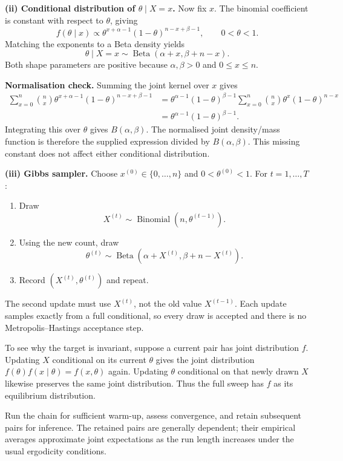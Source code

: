 \documentclass[11pt,a4paper]{article}
\begin{document}
\textbf{(ii) Conditional distribution of $\theta\mid X=x$.}
Now fix $x$. The binomial coefficient is constant with respect to $\theta$,
giving
\[
f(\theta\mid x)\propto
\theta^{x+\alpha-1}(1-\theta)^{n-x+\beta-1},\qquad 0<\theta<1.
\]
Matching the exponents to a Beta density yields
\[
\boxed{\theta\mid X=x\sim
\operatorname{Beta}(\alpha+x,\beta+n-x).}
\]
Both shape parameters are positive because $\alpha,\beta>0$ and
$0\leq x\leq n$.

\textbf{Normalisation check.}
Summing the joint kernel over $x$ gives
\[
\begin{aligned}
\sum_{x=0}^{n}\binom nx
\theta^{x+\alpha-1}(1-\theta)^{n-x+\beta-1}
&=\theta^{\alpha-1}(1-\theta)^{\beta-1}
\sum_{x=0}^{n}\binom nx\theta^x(1-\theta)^{n-x}\\
&=\theta^{\alpha-1}(1-\theta)^{\beta-1}.
\end{aligned}
\]
Integrating this over $\theta$ gives $B(\alpha,\beta)$. The normalised
joint density/mass function is therefore the supplied expression divided
by $B(\alpha,\beta)$. This missing constant does not affect either
conditional distribution.

\textbf{(iii) Gibbs sampler.}
Choose $x^{(0)}\in\{0,\ldots,n\}$ and $0<\theta^{(0)}<1$. For
$t=1,\ldots,T$:
\begin{enumerate}[label=\arabic*.]
  \item Draw
        \[
        X^{(t)}\sim\operatorname{Binomial}(n,\theta^{(t-1)}).
        \]
  \item Using the new count, draw
        \[
        \theta^{(t)}\sim
        \operatorname{Beta}(\alpha+X^{(t)},\beta+n-X^{(t)}).
        \]
  \item Record $(X^{(t)},\theta^{(t)})$ and repeat.
\end{enumerate}
The second update must use $X^{(t)}$, not the old value $X^{(t-1)}$.
Each update samples exactly from a full conditional, so every draw is
accepted and there is no Metropolis--Hastings acceptance step.

To see why the target is invariant, suppose a current pair has joint
distribution $f$. Updating $X$ conditional on its current $\theta$ gives
the joint distribution $f(\theta)f(x\mid\theta)=f(x,\theta)$ again.
Updating $\theta$ conditional on that newly drawn $X$ likewise preserves
the same joint distribution. Thus the full sweep has $f$ as its equilibrium
distribution.

Run the chain for sufficient warm-up, assess convergence, and retain
subsequent pairs for inference. The retained pairs are generally dependent;
their empirical averages approximate joint expectations as the run length
increases under the usual ergodicity conditions.
\end{document}
